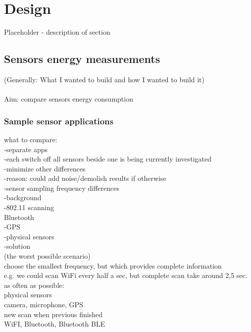 \section{Design}
\label{s:design}
Placeholder - description of section\\
\subsection{Sensors energy measurements}

(Generally: What I wanted to build and how I wanted to build it)\\
\\
Aim: compare sensors energy consumption\\

\subsubsection{Sample sensor applications}
what to compare:\\
	-separate apps\\
	-each switch off all sensors beside one is being currently investigated\\
	-minimize other differences \\
		-reason: could add noise/demolish results  if otherwise\\
		
		
		-sensor sampling frequency differences\\
			-background\\
				-802.11 scanning\\
					Bluetooth\\
				-GPS\\
				-physical sensors\\
			-solution\\
				(the worst possible scenario)\\
				choose the smallest frequency, but which provides complete information\\
					e.g. we could scan WiFi every half a sec, but complete scan take around 2,5 sec.\\
				as often as possible:\\
					physical sensors\\
					camera, microphone, GPS\\	
				new scan when previous finished\\
					WiFI, Bluetooth, Bluetooth BLE\\
					
